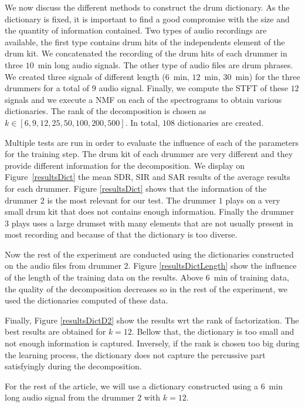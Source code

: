 We now discuss the different methods to construct the drum dictionary. As the dictionary is fixed, it is important to find a good compromise with the size and the quantity of information contained. 
Two types of audio recordings are available, the first type contains drum hits of the independents element of the drum kit. We concatenated the recording of the drum hits of each drummer in three $10$~min long audio signals. The other type of audio files are drum phrases. We created three signals of different length ($6$~min, $12$~min, $30$~min) for the three drummers for a total of $9$ audio signal. 
Finally, we compute the STFT of these $12$ signals and we execute a NMF on each of the spectrograms to obtain various dictionaries. The rank of the decomposition is chosen as $k \in [6,9,12,25,50,100,200,500]$. In total, $108$ dictionaries are created. 

Multiple tests are run in order to evaluate the influence of each of the parameters for the training step. The drum kit of each drummer are very different and they provide different information for the decomposition. We display on Figure~\ref{resultsDict} the mean SDR, SIR and SAR results of the average results for each drummer. Figure \ref{resultsDict} shows that the information of the drummer $2$ is the most relevant for our test. The drummer $1$ plays on a very small drum kit that does not contains enough information. Finally the drummer $3$ plays uses a large drumset with many elements that are not usually present in most recording and because of that the dictionary is too diverse.

Now the rest of the experiment are conducted using the dictionaries constructed on the audio files from drummer $2$. Figure \ref{resultsDictLength} show the influence of the length of the training data on the results. Above $6$~min of training data, the quality of the decomposition decreases so in the rest of the experiment, we used the dictionaries computed of these data.

Finally, Figure \ref{resultsDictD2} show the results wrt the rank of factorization. The best results are obtained for $k=12$. Bellow that, the dictionary is too small and not enough information is captured. Inversely, if the rank is chosen too big during the learning process, the dictionary does not capture the percussive part satisfyingly during the decomposition.

For the rest of the article, we will use a dictionary constructed using a $6$~min long audio signal from the drummer $2$ with $k=12$.

